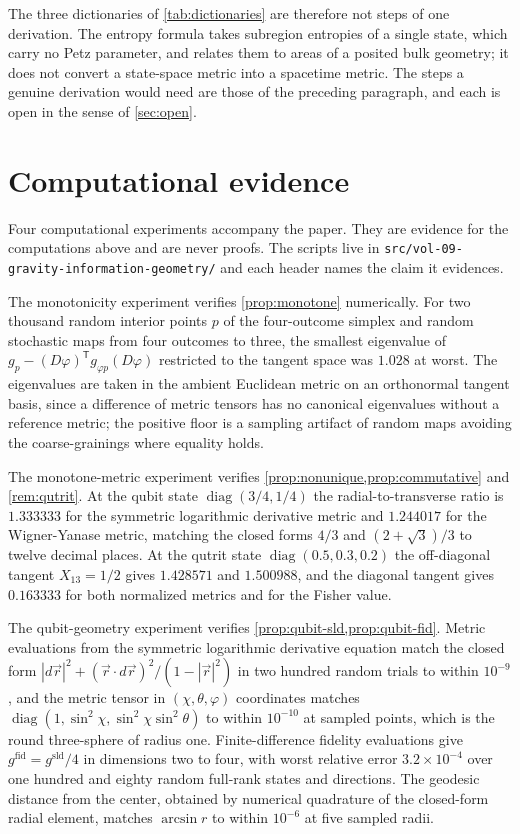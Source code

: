 \documentclass[11pt,letterpaper]{article}
\theoremstyle{definition}
\theoremstyle{remark}
\begin{document}
The three dictionaries of \cref{tab:dictionaries} are therefore not steps of one derivation. The entropy formula takes subregion entropies of a single state, which carry no Petz parameter, and relates them to areas of a posited bulk geometry; it does not convert a state-space metric into a spacetime metric. The steps a genuine derivation would need are those of the preceding paragraph, and each is open in the sense of \cref{sec:open}.

\section{Computational evidence}
\label{sec:computation}

Four computational experiments accompany the paper. They are evidence for the computations above and are never proofs. The scripts live in \texttt{src/vol-09-gravity-information-geometry/} and each header names the claim it evidences.

The monotonicity experiment verifies \cref{prop:monotone} numerically. For two thousand random interior points $p$ of the four-outcome simplex and random stochastic maps from four outcomes to three, the smallest eigenvalue of $g_p - (D\varphi)^{\mathsf{T}} g_{\varphi p} (D\varphi)$ restricted to the tangent space was $1.028$ at worst. The eigenvalues are taken in the ambient Euclidean metric on an orthonormal tangent basis, since a difference of metric tensors has no canonical eigenvalues without a reference metric; the positive floor is a sampling artifact of random maps avoiding the coarse-grainings where equality holds.

The monotone-metric experiment verifies \cref{prop:nonunique,prop:commutative} and \cref{rem:qutrit}. At the qubit state $\operatorname{diag}(3/4, 1/4)$ the radial-to-transverse ratio is $1.333333$ for the symmetric logarithmic derivative metric and $1.244017$ for the Wigner-Yanase metric, matching the closed forms $4/3$ and $(2+\sqrt{3})/3$ to twelve decimal places. At the qutrit state $\operatorname{diag}(0.5, 0.3, 0.2)$ the off-diagonal tangent $X_{13} = 1/2$ gives $1.428571$ and $1.500988$, and the diagonal tangent gives $0.163333$ for both normalized metrics and for the Fisher value.

The qubit-geometry experiment verifies \cref{prop:qubit-sld,prop:qubit-fid}. Metric evaluations from the symmetric logarithmic derivative equation match the closed form $|d\vec{r}|^2 + (\vec{r} \cdot d\vec{r})^2 / (1 - |\vec{r}|^2)$ in two hundred random trials to within $10^{-9}$, and the metric tensor in $(\chi, \theta, \varphi)$ coordinates matches $\operatorname{diag}(1, \sin^2\!\chi, \sin^2\!\chi \sin^2\!\theta)$ to within $10^{-10}$ at sampled points, which is the round three-sphere of radius one. Finite-difference fidelity evaluations give $g^{\mathrm{fid}} = g^{\mathrm{sld}}/4$ in dimensions two to four, with worst relative error $3.2 \times 10^{-4}$ over one hundred and eighty random full-rank states and directions. The geodesic distance from the center, obtained by numerical quadrature of the closed-form radial element, matches $\arcsin r$ to within $10^{-6}$ at five sampled radii.
\end{document}
